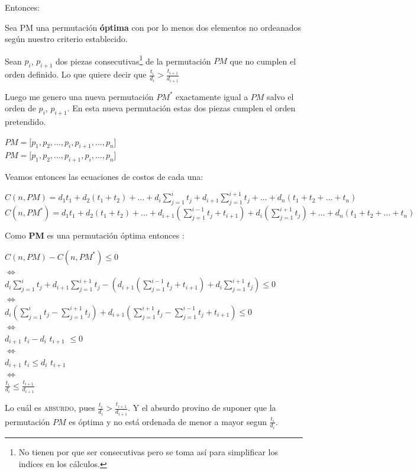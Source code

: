 \documentclass[11pt,a4paper]{article}
\newcommand{\sisosi}{\Leftrightarrow}
\newcommand{\suma}[2]{\sum\limits_{#1}^{#2}}
\newcommand{\bc}{\begin{center}}
\newcommand{\ec}{\end{center}}
\begin{document}
Entonces:

Sea PM una permutaci\'on \textbf{\'optima} con por lo menos dos elementos no ordeanados seg\'un nuestro criterio establecido.

Sean $p_i$, $p_{i+1}$ dos piezas consecutivas\footnote{No tienen por que ser consecutivas pero se toma as\'i para simplificar los indices en los c\'alculos.} de la permutaci\'on $PM$ que no cumplen el orden definido. Lo que quiere decir que $\frac{t_i}{d_i} > \frac{t_{i+1}}{d_{i+1}}$

Luego me genero una nueva permutaci\'on $PM^*$ exactamente igual a $PM$ salvo el orden de $p_i$, $p_{i+1}$. En esta nueva permutaci\'on estas dos piezas cumplen el orden pretendido.

\bc
$PM = [p_1, p_2, \ldots, p_i, p_{i+1}, \ldots , p_n$]\\
$PM = [p_1, p_2, \ldots, p_{i+1}, p_i, \ldots , p_n$]
\ec


Veamos entonces las ecuaciones de costos de cada una:

\bc
$C(n, PM) = d_1t_1 + d_2(t_1 + t_2) + \ldots + d_i\suma{j=1}{i}t_j + d_{i+1}\suma{j=1}{i+1}t_j + \ldots + d_n(t_1 + t_2 + \ldots +t_n)$\\
$C(n, PM^*) = d_1t_1 + d_2(t_1 + t_2) + \ldots + d_{i+1}(\suma{j=1}{i-1}t_j + t_{i+1})+ d_i(\suma{j=1}{i+1}t_j)  + \ldots + d_n(t_1 + t_2 + \ldots +t_n)$\\
\ec

Como \textbf{PM} es una permutaci\'on \'optima entonces :

\bc
$C(n, PM) - C(n,PM^*) \le 0$\\
$\sisosi$\\
$ d_i\suma{j=1}{i}t_j + d_{i+1}\suma{j=1}{i+1}t_j - (d_{i+1}(\suma{j=1}{i-1}t_j + t_{i+1})+ d_i\suma{j=1}{i+1}t_j) \le 0$\\
$\sisosi$\\
$d_{i}(\suma{j=1}{i}t_j - \suma{j=1}{i+1}t_j) + d_{i+1}(\suma{j=1}{i+1}t_j - \suma{j=1}{i-1}t_j + t_{i+1}) \le 0$\\
$\sisosi$\\
$d_{i+1}$ $t_i - d_i$ $t_{i+1}$ $\le 0$\\
$\sisosi$\\
$d_{i+1}$ $t_i \le d_i$ $t_{i+1}$\\
$\sisosi$\\
$\frac{t_i}{d_i} \le \frac{t_{i+1}}{d_{i+1}}$\\
\ec

Lo cu\'al es \textsc{absurdo}, pues $\frac{t_i}{d_i} > \frac{t_{i+1}}{d_{i+1}}$. Y el absurdo provino de suponer que la permutaci\'on $PM$ es \'optima y no est\'a ordenada de menor a mayor segun $\frac{t_i}{d_i}$.\\
\end{document}
